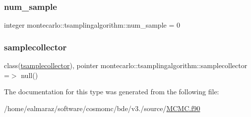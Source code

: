\subsubsection{\texorpdfstring{num\+\_\+sample}{num\_sample}}
{\footnotesize\ttfamily integer montecarlo\+::tsamplingalgorithm\+::num\+\_\+sample = 0\hspace{0.3cm}{\ttfamily [private]}}

\mbox{\label{structmontecarlo_1_1tsamplingalgorithm_a96a8462dc05a5e209fc5ef2bab8b892e}} 
\subsubsection{\texorpdfstring{samplecollector}{samplecollector}}
{\footnotesize\ttfamily class(\mbox{\hyperlink{structmontecarlo_1_1tsamplecollector}{tsamplecollector}}), pointer montecarlo\+::tsamplingalgorithm\+::samplecollector =$>$ null()\hspace{0.3cm}{\ttfamily [private]}}



The documentation for this type was generated from the following file\+:\begin{DoxyCompactItemize}
\item 
/home/ealmaraz/software/cosmomc/bde/v3./source/\mbox{\hyperlink{MCMC_8f90}{M\+C\+M\+C.\+f90}}\end{DoxyCompactItemize}
